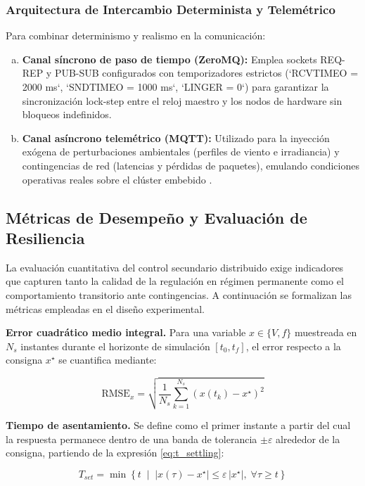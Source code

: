 \subsubsection{Arquitectura de Intercambio Determinista y Telemétrico}
Para combinar determinismo y realismo en la comunicación:
\begin{enumerate}[a)]
    \item \textbf{Canal síncrono de paso de tiempo (ZeroMQ):} Emplea sockets REQ-REP y PUB-SUB configurados con temporizadores estrictos (`RCVTIMEO = 2000 ms`, `SNDTIMEO = 1000 ms`, `LINGER = 0`) para garantizar la sincronización lock-step entre el reloj maestro y los nodos de hardware sin bloqueos indefinidos.
    \item \textbf{Canal asíncrono telemétrico (MQTT):} Utilizado para la inyección exógena de perturbaciones ambientales (perfiles de viento e irradiancia) y contingencias de red (latencias y pérdidas de paquetes), emulando condiciones operativas reales sobre el clúster embebido \citep{Diaz2025}.
\end{enumerate}

\subsection{Métricas de Desempeño y Evaluación de Resiliencia}

La evaluación cuantitativa del control secundario distribuido exige indicadores que capturen tanto la calidad de la regulación en régimen permanente como el comportamiento transitorio ante contingencias. A continuación se formalizan las métricas empleadas en el diseño experimental.

\textbf{Error cuadrático medio integral.} Para una variable $x \in \{V, f\}$ muestreada en $N_s$ instantes durante el horizonte de simulación $[t_0, t_f]$, el error respecto a la consigna $x^\star$ se cuantifica mediante:

\begin{equation}\label{eq:rmse}
\text{RMSE}_x = \sqrt{\frac{1}{N_s}\sum_{k=1}^{N_s}\left(x(t_k) - x^\star\right)^2}
\end{equation}

\textbf{Tiempo de asentamiento.} Se define como el primer instante a partir del cual la respuesta permanece dentro de una banda de tolerancia $\pm\varepsilon$ alrededor de la consigna, partiendo de la expresión \eqref{eq:t_settling}:

\begin{equation}\label{eq:tset_band}
T_{set} = \min\left\{ t \;\middle|\; |x(\tau) - x^\star| \le \varepsilon\,|x^\star|, \; \forall \tau \ge t \right\}
\end{equation}

